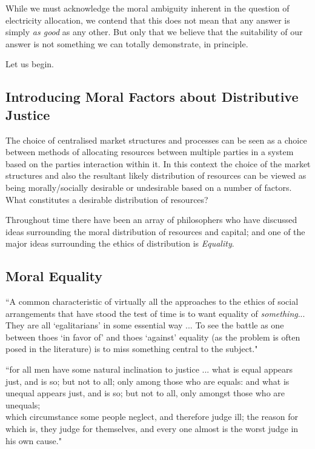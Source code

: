 While we must acknowledge the moral ambiguity inherent in the question of electricity allocation, we contend that this does not mean that any answer is simply \textit{as good} as any other. But only that we believe that the suitability of our answer is not something we can totally demonstrate, in principle.

Let us begin.

\subsection{Introducing Moral Factors about Distributive Justice}

The choice of centralised market structures and processes can be seen as a choice between methods of allocating resources between multiple parties in a system based on the parties interaction within it.
In this context the choice of the market structures and also the resultant likely distribution of resources can be viewed as being morally/socially desirable or undesirable based on a number of factors.
What constitutes a desirable distribution of resources?


Throughout time there have been an array of philosophers who have discussed ideas surrounding the moral distribution of resources and capital; and one of the major ideas surrounding the ethics of distribution is \textit{Equality}.

\subsection{Moral Equality}

\begin{displayquote}
``A common characteristic of virtually all the approaches to the ethics of social arrangements that have stood the test of time is to want equality of \textit{something}... They are all `egalitarians' in some essential way ... To see the battle as one between thoes `in favor of' and thoes `against' equality (as the problem is often posed in the literature) is to miss something central to the subject."\cite[Chapter 1]{18084} 
\end{displayquote}

\begin{displayquote}
``for all men have some natural inclination to justice ... what is equal appears just, and is so; but not to all; only among those who are equals: and what is unequal appears just, and is so; but not to all, only amongst those who are unequals;\\
which circumstance some people neglect, and therefore judge ill; the reason for which is, they judge for themselves, and every one almost is the worst judge in his own cause." \cite[Politics, chapter III.9]{AristotleGutenberg}
\end{displayquote}


